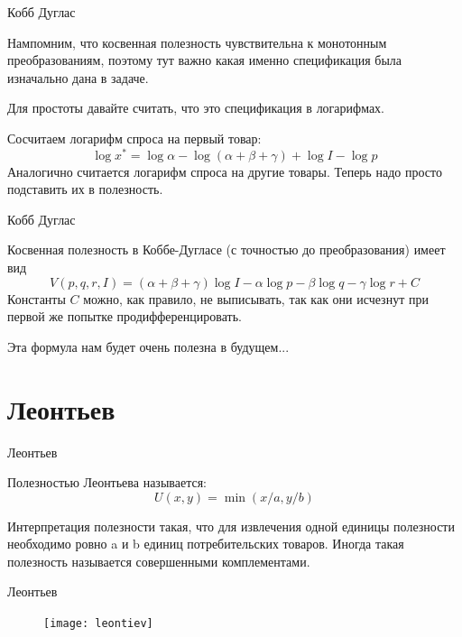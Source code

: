 \documentclass{beamer}
\begin{document}
\begin{frame}{Кобб Дуглас}

Нампомним, что косвенная полезность чувствительна к монотонным преобразованиям, поэтому тут важно какая именно спецификация была изначально дана в задаче. 

Для простоты давайте считать, что это спецификация в логарифмах.

Сосчитаем логарифм спроса на первый товар:
$$\log x^{\ast} = \log \alpha - \log (\alpha + \beta + \gamma) + \log I - \log p$$
Аналогично считается логарифм спроса на другие товары. Теперь надо просто подставить их в полезность.

\end{frame}

\begin{frame}{Кобб Дуглас}

Косвенная полезность в Коббе-Дугласе (с точностью до преобразования) имеет вид
$$V(p,q,r,I) = (\alpha + \beta + \gamma) \log I - \alpha \log p - \beta \log q - \gamma \log r + C $$
Константы $C$ можно, как правило, не выписывать, так как они исчезнут при первой же попытке продифференцировать.

Эта формула нам будет очень полезна в будущем...
\end{frame}

\section{Леонтьев}

\begin{frame}{Леонтьев}

\begin{definition}
Полезностью \alert{Леонтьева} называется:
$$U(x, y) = \min(x/a, y/b)$$  
\end{definition}

Интерпретация полезности такая, что для извлечения одной единицы полезности необходимо ровно a и b единиц потребительских товаров. Иногда такая полезность называется \alert{совершенными комплементами}.

\end{frame}

\begin{frame}{Леонтьев}

\begin{figure}[hbt]
\centering
\texttt{[image: leontiev]}
\end{figure}

\end{frame}
\end{document}
